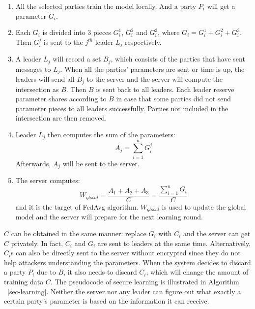 \begin{enumerate}
    \item All the selected parties train the model locally. And a party $P_i$ will get a parameter $G_i$.
    
    \item Each $G_i$ is divided into 3 pieces $G_i^1$, $G_i^2$ and $G_i^3$, where $G_i = G_i^1 + G_i^2 + G_i^3$. Then $G_i^j$ is sent to the $j^{th}$ leader $L_j$ respectively.
    
    \item A leader $L_j$ will record a set $B_j$, which consists of the parties that have sent messages to $L_j$. When all the parties' parameters are sent or time is up, the leaders will send all $B_j$ to the server and the server will compute the intersection as $B$. Then $B$ is sent back to all leaders. Each leader reserve parameter shares according to $B$ in case that some parties did not send parameter pieces to all leaders successfully. Parties not included in the intersection are then removed. 

    \item Leader $L_j$ then computes the sum of the parameters:
    $$A_j = \sum_{i=1}^nG_i^j$$ 
    Afterwards, $A_j$ will be sent to the server.

    \item The server computes: 
    $$W_{global} = \frac{A_1 + A_2 + A_3}{C}  = \frac{\sum_{i=1}^nG_i}{C} $$ 
    and it is the target of FedAvg algorithm. $W_{global}$ is used to update the global model and the server will prepare for the next learning round.
\end{enumerate}

$C$ can be obtained in the same manner: replace $G_i$ with $C_i$ and the server can get $C$ privately. In fact, $C_i$ and $G_i$ are sent to leaders at the same time. Alternatively, $C_i$s can also be directly sent to the server without encrypted since they do not help attackers understanding the parameters. When the system decides to discard a party $P_i$ due to $B$, it also needs to discard $C_i$, which will change the amount of training data $C$. The pseudocode of secure learning is illustrated in Algorithm ~\ref{sec-learning}. Neither the server nor any leader can figure out what exactly a certain party's parameter is based on the information it can receive. 

